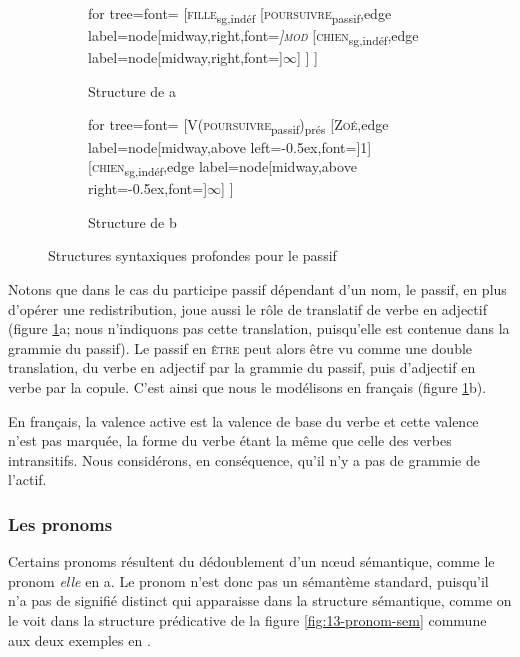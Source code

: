 \begin{figure}
	\begin{subfigure}[b]{0.5\textwidth}
		\centering
		\begin{forest} for tree={font=\normalfont}
			[\textsc{fille}\textsubscript{sg,indéf}
				[\textsc{poursuivre}\textsubscript{passif},edge label={node[midway,right,font=\footnotesize\itshape]{\textsc{mod}}}
					[\textsc{chien}\textsubscript{sg,indéf},edge label={node[midway,right,font=\footnotesize]{$\infty$}}]
				]
			]
		\end{forest}
		\caption{Structure de a}
	\end{subfigure}%
	\hfill
	\begin{subfigure}[b]{0.5\textwidth}
		\centering
		\begin{forest} for tree={font=\normalfont}
			[V(\textsc{poursuivre}\textsubscript{passif})\textsubscript{prés}
				[\textsc{Zoé},edge label={node[midway,above left=-0.5ex,font=\footnotesize]{1}}]
				[\textsc{chien}\textsubscript{sg,indéf},edge label={node[midway,above right=-0.5ex,font=\footnotesize]{$\infty$}}]
			]
		\end{forest}
		\caption{Structure de b}
	\end{subfigure}
\caption{Structures syntaxiques profondes pour le passif\label{fig:13-passif}}
\end{figure}

Notons que dans le cas du participe passif dépendant d’un nom, le passif, en plus d’opérer une redistribution, joue aussi le rôle de translatif de verbe en adjectif (figure \ref{fig:13-passif}a; nous n’indiquons pas cette translation, puisqu’elle est contenue dans la grammie du passif). Le passif en \textsc{être} peut alors être vu comme une double translation, du verbe en adjectif par la grammie du passif, puis d’adjectif en verbe par la copule. C’est ainsi que nous le modélisons en français (figure \ref{fig:13-passif}b).

En français, la valence active est la valence de base du verbe et cette valence n'est pas marquée, la forme du verbe étant la même que celle des verbes intransitifs.  Nous considérons, en conséquence, qu'il n'y a pas de grammie de l'actif.


\subsubsection{Les pronoms}
Certains pronoms résultent du dédoublement d’un nœud sémantique, comme le pronom \textit{elle} en a. Le pronom n’est donc pas un sémantème standard, puisqu’il n’a pas de signifié distinct qui apparaisse dans la structure sémantique, comme on le voit dans la structure prédicative de la figure \ref{fig:13-pronom-sem} commune aux deux exemples en .


